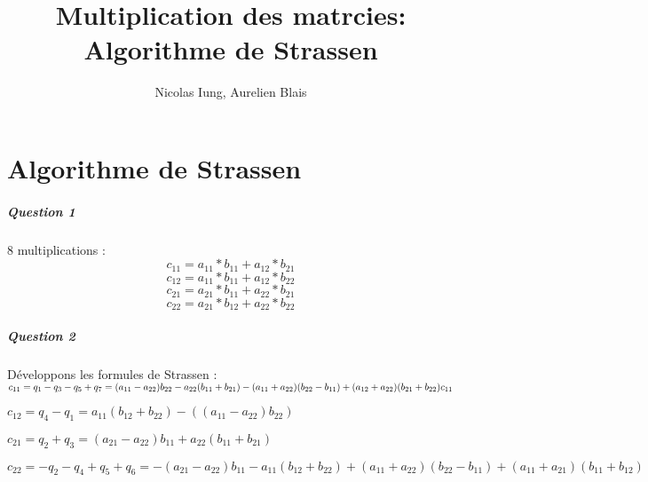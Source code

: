 \documentclass[a4paper,10pt]{report}
\title{Multiplication des matrcies: Algorithme de Strassen}
\author{Nicolas Iung, Aurelien Blais}
\begin{document}
\maketitle

\chapter{Algorithme de Strassen}
\paragraph{Question 1}
8 multiplications :
\begin{equation}
 c_{11} = a_{11}*b_{11}+a_{12}*b_{21}
\end{equation}
\begin{equation}
 c_{12} = a_{11}*b_{11}+a_{12}*b_{22}
\end{equation}
\begin{equation}
 c_{21} = a_{21}*b_{11}+a_{22}*b_{21}
\end{equation}
\begin{equation}
 c_{22} = a_{21}*b_{12}+a_{22}*b_{22}
\end{equation}
\paragraph{Question 2}
Développons les formules de Strassen :\\


\begin{math}
 c_{11} = q_1-q_3-q_5+q_7 = (a_{11}-a_{22})b_{22}-a_{22}(b_{11}+b_{21})-(a_{11}+a_{22})(b_{22}-b_{11})+(a_{12}+a_{22})(b_{21}+b_{22}) \\
 c_{11} 
\end{math}

\bigskip
\begin{math}
 c_{12} = q_4-q_1 = a_{11}(b_{12}+b_{22})-((a_{11}-a_{22})b_{22})
\end{math}

\bigskip
\begin{math}
 c_{21} = q_2+q_3 = (a_{21}-a_{22})b_{11}+a_{22}(b_{11}+b_{21})
\end{math}

\bigskip
\begin{math}
 c_{22} = -q_2-q_4+q_5+q_6 = -(a_{21}-a_{22})b_{11}-a_{11}(b_{12}+b_{22})+(a_{11}+a_{22})(b_{22}-b_{11})+(a_{11}+a_{21})(b_{11}+b_{12})
\end{math}
\end{document}
